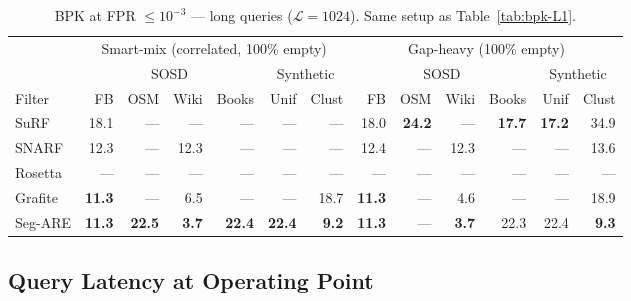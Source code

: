\begin{table}[H]
    \centering
    \footnotesize
    \setlength{\tabcolsep}{4pt}
    \begin{tabular}{@{}lrrrrrr|rrrrrr@{}}
        \toprule
        & \multicolumn{6}{c|}{Smart-mix (correlated, 100\% empty)} & \multicolumn{6}{c}{Gap-heavy (100\% empty)} \\
        \cmidrule(lr){2-7} \cmidrule(lr){8-13}
        & \multicolumn{4}{c}{SOSD} & \multicolumn{2}{c|}{Synthetic} & \multicolumn{4}{c}{SOSD} & \multicolumn{2}{c}{Synthetic} \\
        \cmidrule(lr){2-5} \cmidrule(lr){6-7} \cmidrule(lr){8-11} \cmidrule(lr){12-13}
        Filter & FB & OSM & Wiki & Books & Unif & Clust & FB & OSM & Wiki & Books & Unif & Clust \\
        \midrule
        SuRF    & 18.1          & \textnormal{---} & \textnormal{---} & \textnormal{---} & \textnormal{---} & \textnormal{---} & 18.0          & \textbf{24.2} & \textnormal{---} & \textbf{17.7} & \textbf{17.2} & 34.9 \\
        SNARF   & 12.3          & \textnormal{---} & 12.3          & \textnormal{---} & \textnormal{---} & \textnormal{---} & 12.4          & \textnormal{---} & 12.3          & \textnormal{---} & \textnormal{---} & 13.6 \\
        Rosetta & \textnormal{---} & \textnormal{---} & \textnormal{---} & \textnormal{---} & \textnormal{---} & \textnormal{---} & \textnormal{---} & \textnormal{---} & \textnormal{---} & \textnormal{---} & \textnormal{---} & \textnormal{---} \\
        Grafite & \textbf{11.3} & \textnormal{---} & 6.5           & \textnormal{---} & \textnormal{---} & 18.7          & \textbf{11.3} & \textnormal{---} & 4.6           & \textnormal{---} & \textnormal{---} & 18.9 \\
        Seg-ARE & \textbf{11.3} & \textbf{22.5} & \textbf{3.7}  & \textbf{22.4} & \textbf{22.4} & \textbf{9.2}  & \textbf{11.3} & \textnormal{---} & \textbf{3.7}  & 22.3          & 22.4          & \textbf{9.3} \\
        \bottomrule
    \end{tabular}
    \caption{BPK at FPR $\leq 10^{-3}$ --- long queries ($\mathcal{L}=1024$).
             Same setup as Table~\ref{tab:bpk-L1}.}
    \label{tab:bpk-L1024}
\end{table}

\subsection{Query Latency at Operating Point}
\label{subsec:eval-latency}

